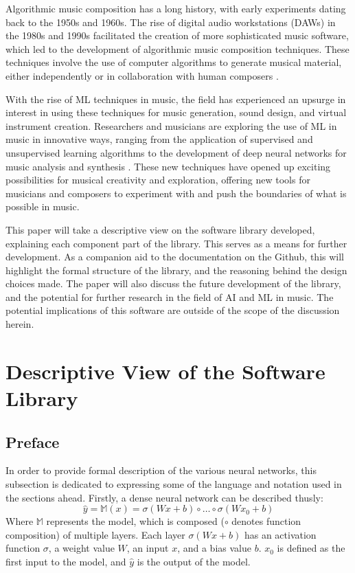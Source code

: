 \documentclass{article}
\begin{document}
Algorithmic music composition has a long history, with early experiments dating back to the 1950s and 1960s. The rise of digital audio workstations (DAWs) in the 1980s and 1990s \citep{jackson2015history} facilitated the creation of more sophisticated music software, which led to the development of algorithmic music composition techniques. These techniques involve the use of computer algorithms to generate musical material, either independently or in collaboration with human composers \citep{alpern1995techniques}.

With the rise of ML techniques in music, the field has experienced an upsurge in interest in using these techniques for music generation, sound design, and virtual instrument creation. Researchers and musicians are exploring the use of ML in music in innovative ways, ranging from the application of supervised and unsupervised learning algorithms to the development of deep neural networks for music analysis \citep{miranda2013readings} and synthesis \citep{roads1985research}. These new techniques have opened up exciting possibilities for musical creativity and exploration, offering new tools for musicians and composers to experiment with and push the boundaries of what is possible in music.

This paper will take a descriptive view on the software library developed, explaining each component part of the library. This serves as a means for further development. As a companion aid to the documentation on the Github, this will highlight the formal structure of the library, and the reasoning behind the design choices made. The paper will also discuss the future development of the library, and the potential for further research in the field of AI and ML in music. The potential implications of this software are outside of the scope of the discussion herein.

\section{Descriptive View of the Software Library}
\label{sec:descriptive}
\subsection{Preface}
\label{subsec:preface}
In order to provide formal description of the various neural networks, this subsection is dedicated to expressing some of the language and notation used in the sections ahead. Firstly, a dense neural network can be described thusly:
\begin{equation}
	\label{eq:dense}
	\hat{y} = \mathbb{M}(x) = \sigma(Wx+b)\circ \dots \circ \sigma(Wx_0 + b)
\end{equation}
Where $\mathbb{M}$ represents the model, which is composed ($\circ$ denotes function composition) of multiple layers. Each layer $\sigma(Wx+b)$ has an activation function $\sigma$, a weight value $W$, an input $x$, and a bias value $b$. $x_0$ is defined as the first input to the model, and $\hat{y}$ is the output of the model.
\end{document}
